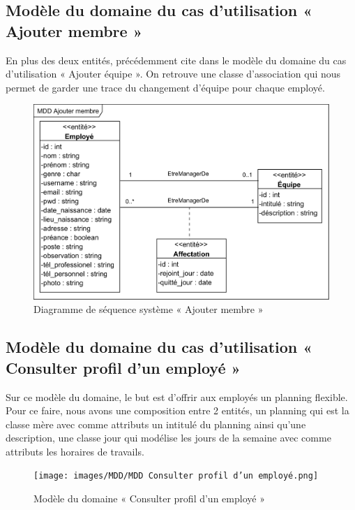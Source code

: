         \subsection*{Modèle du domaine du cas d'utilisation « Ajouter membre »}
        En plus des deux entités, précédemment cite dans le modèle du domaine du cas d’utilisation « Ajouter équipe ». On retrouve une classe d’association qui nous permet de garder une trace du changement d’équipe pour chaque employé.
        \clearpage
            \begin{figure}[h!]
                 \centering
                \includegraphics[scale=1.22]{images/MDD/MDD Ajouter membre.png}
                 \caption{Diagramme de séquence système « Ajouter membre »}
                 \label{fig17}
            \end{figure}


        \subsection*{Modèle du domaine du cas d'utilisation « Consulter profil d'un employé »}
        Sur ce modèle du domaine, le but est d’offrir aux employés un planning flexible. Pour ce faire, nous avons une composition entre 2 entités, un planning qui est la classe mère avec comme attributs un intitulé du planning ainsi qu’une description, une classe jour qui modélise les jours de la semaine avec comme attributs les horaires de travails.
        \clearpage
            \begin{figure}[h!]
                 \centering
                \texttt{[image: images/MDD/MDD Consulter profil d'un employé.png]}
                 \caption{Modèle du domaine « Consulter profil d'un employé »}
                 \label{fig18}
            \end{figure}
            
